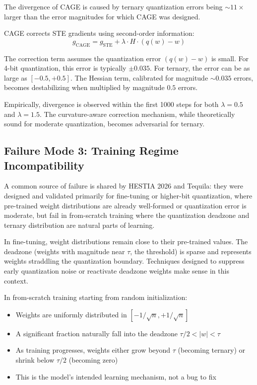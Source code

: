 \documentclass{article}
\begin{document}
The divergence of CAGE is caused by ternary quantization errors being ${\sim}11\times$ larger than the error magnitudes for which CAGE was designed.

CAGE corrects STE gradients using second-order information:
\begin{equation}
g_\text{CAGE} = g_\text{STE} + \lambda \cdot H \cdot (q(w) - w)
\end{equation}

The correction term assumes the quantization error $(q(w) - w)$ is small. For 4-bit quantization, this error is typically $\pm 0.035$. For ternary, the error can be as large as $[-0.5, +0.5]$. The Hessian term, calibrated for magnitude ${\sim}0.035$ errors, becomes destabilizing when multiplied by magnitude $0.5$ errors.

Empirically, divergence is observed within the first 1000 steps for both $\lambda=0.5$ and $\lambda=1.5$. The curvature-aware correction mechanism, while theoretically sound for moderate quantization, becomes adversarial for ternary.

\subsection{Failure Mode 3: Training Regime Incompatibility}

A common source of failure is shared by HESTIA 2026 and Tequila: they were designed and validated primarily for fine-tuning or higher-bit quantization, where pre-trained weight distributions are already well-formed or quantization error is moderate, but fail in from-scratch training where the quantization deadzone and ternary distribution are natural parts of learning.

In fine-tuning, weight distributions remain close to their pre-trained values. The deadzone (weights with magnitude near $\tau$, the threshold) is sparse and represents weights straddling the quantization boundary. Techniques designed to suppress early quantization noise or reactivate deadzone weights make sense in this context.

In from-scratch training starting from random initialization:
\begin{itemize}
    \item Weights are uniformly distributed in $[-1/\sqrt{n}, +1/\sqrt{n}]$
    \item A significant fraction naturally fall into the deadzone $\tau/2 < |w| < \tau$
    \item As training progresses, weights either grow beyond $\tau$ (becoming ternary) or shrink below $\tau/2$ (becoming zero)
    \item This is the model's intended learning mechanism, not a bug to fix
\end{itemize}
\end{document}
